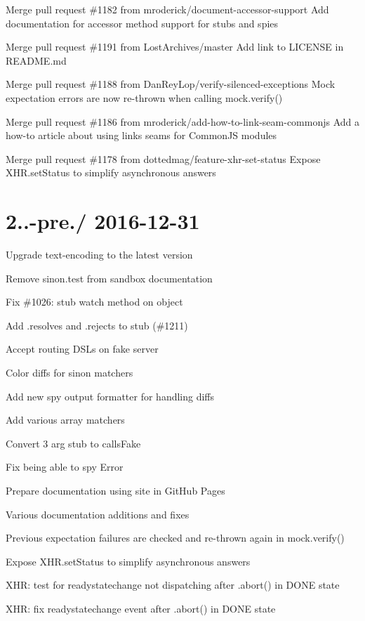 \begin{DoxyItemize}
\item Merge pull request \#1182 from mroderick/document-\/accessor-\/support Add documentation for accessor method support for stubs and spies
\item Merge pull request \#1191 from Lost\+Archives/master Add link to L\+I\+C\+E\+N\+SE in R\+E\+A\+D\+M\+E.\+md
\item Merge pull request \#1188 from Dan\+Rey\+Lop/verify-\/silenced-\/exceptions Mock expectation errors are now re-\/thrown when calling mock.\+verify()
\item Merge pull request \#1186 from mroderick/add-\/how-\/to-\/link-\/seam-\/commonjs Add a how-\/to article about using links seams for Common\+JS modules
\item Merge pull request \#1178 from dottedmag/feature-\/xhr-\/set-\/status Expose X\+H\+R.\+set\+Status to simplify asynchronous answers
\end{DoxyItemize}

\section*{2..-\/pre./ 2016-\/12-\/31 }


\begin{DoxyItemize}
\item Upgrade text-\/encoding to the latest version
\item Remove sinon.\+test from sandbox documentation
\item Fix \#1026\+: stub watch method on object
\item Add .resolves and .rejects to stub (\#1211)
\item Accept routing D\+S\+Ls on fake server
\item Color diffs for sinon matchers
\item Add new spy output formatter for handling diffs
\item Add various array matchers
\item Convert 3 arg stub to calls\+Fake
\item Fix being able to spy Error
\item Prepare documentation using site in Git\+Hub Pages
\item Various documentation additions and fixes
\item Previous expectation failures are checked and re-\/thrown again in mock.\+verify()
\item Expose X\+H\+R.\+set\+Status to simplify asynchronous answers
\item X\+HR\+: test for readystatechange not dispatching after .abort() in D\+O\+NE state
\item X\+HR\+: fix readystatechange event after .abort() in D\+O\+NE state
\end{DoxyItemize}

